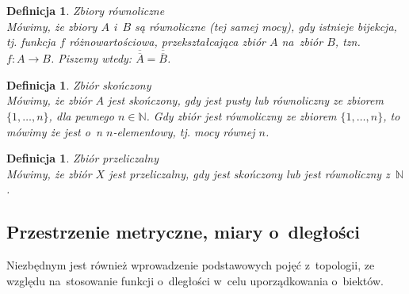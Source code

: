 \documentclass[12pt,a4paper]{report}
\newtheorem{definition}[theorem]{Definicja}
\newcommand{\licznosc}[1]{\overline{\overline{#1}}}
\begin{document}
\begin{definition}{Zbiory równoliczne \cite[Rozdział 5]{blaszczyk2007}}\\
Mówimy, że zbiory $A$ i~$B$ są równoliczne (tej samej mocy), gdy istnieje bijekcja, tj. funkcja $f$ różnowartościowa, przekształcająca zbiór $A$ na~zbiór $B$, tzn. $f: A \rightarrow B$. Piszemy wtedy:  $\licznosc{A}=\licznosc{B}$.
\end{definition}


\begin{definition}{Zbiór skończony \cite[Rozdział 5]{blaszczyk2007}}\\
Mówimy, że zbiór $A$ jest skończony, gdy jest pusty lub równoliczny ze zbiorem $\{1, \ldots, n \}$, dla pewnego $n \in \mathbb{N}$. Gdy zbiór jest równoliczny ze zbiorem $\{1, \ldots, n\}$, to mówimy że jest o~n $n$-elementowy, tj. mocy równej $n$.
\end{definition}


\begin{definition}{Zbiór przeliczalny \cite[Rozdział 5]{blaszczyk2007}}\\
Mówimy, że zbiór $X$ jest przeliczalny, gdy jest skończony lub jest równoliczny z~$\mathbb{N}$.
\end{definition}






\subsection{Przestrzenie metryczne, miary o~dległości}


Niezbędnym jest również wprowadzenie podstawowych pojęć z~topologii, ze względu na~stosowanie funkcji o~dległości w~celu uporządkowania o~biektów.
\end{document}
